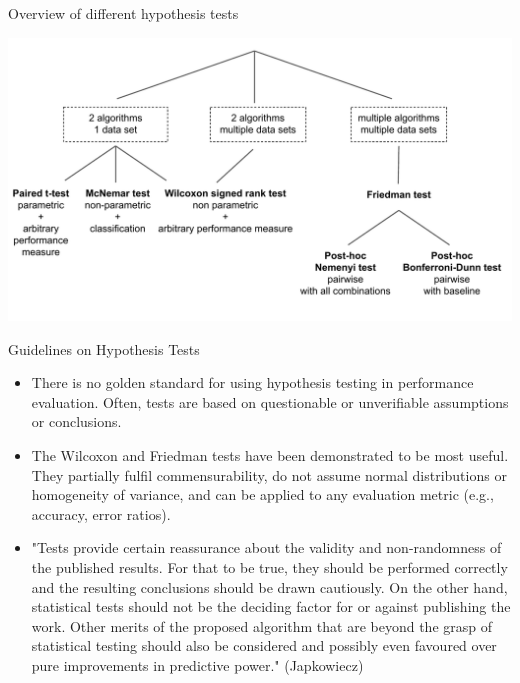 \documentclass[11pt,compress,t,notes=noshow, xcolor=table]{beamer}
\begin{document}
\begin{frame}{Overview of different hypothesis tests}
\begin{center}\includegraphics[width = 1\textwidth]{figure/tests.pdf} \end{center}


\end{frame}


\begin{frame}{Guidelines on Hypothesis Tests}

\vfill
\begin{itemize}
    \item There is no golden standard for using hypothesis testing in performance evaluation. Often, tests are based on questionable or unverifiable assumptions or conclusions.
    \item The Wilcoxon and Friedman tests have been demonstrated to be most useful. They partially fulfil commensurability, do not assume normal distributions or homogeneity of variance, and can be applied to any evaluation metric (e.g., accuracy, error ratios).
    \item  "Tests provide certain reassurance about the validity and non-randomness of the published  results. For that to be true, they should be performed correctly and the resulting conclusions should  be drawn cautiously. On the other hand, statistical tests should not be the deciding factor for or  against publishing the work. Other merits of the proposed algorithm that are beyond the grasp of  statistical testing should also be considered and possibly even favoured over pure improvements in  predictive power." (Japkowiecz)
\end{itemize}
\vfill

\end{frame}
\end{document}
